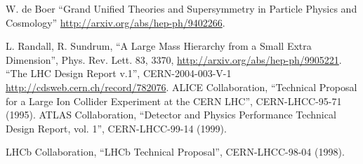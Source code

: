 \begin{thebibliography}{99}
 W. de Boer ``Grand Unified Theories and Supersymmetry in Particle Physics and Cosmology'' {\url{http://arxiv.org/abs/hep-ph/9402266}}.


 L. Randall, R. Sundrum, ``A Large Mass Hierarchy from a Small Extra Dimension'', Phys. Rev. Lett. 83, 3370, \url{http://arxiv.org/abs/hep-ph/9905221}.
 ``The LHC Design Report v.1'', CERN-2004-003-V-1 {\url {http://cdsweb.cern.ch/record/782076}}.
 ALICE Collaboration, ``Technical Proposal for a Large Ion Collider Experiment at the CERN LHC'', CERN-LHCC-95-71 (1995).
 ATLAS Collaboration, ``Detector and Physics Performance Technical Design Report, vol. 1'',
CERN-LHCC-99-14 (1999).

 LHCb Collaboration, ``LHCb Technical Proposal'', CERN-LHCC-98-04 (1998).


\end{thebibliography}

